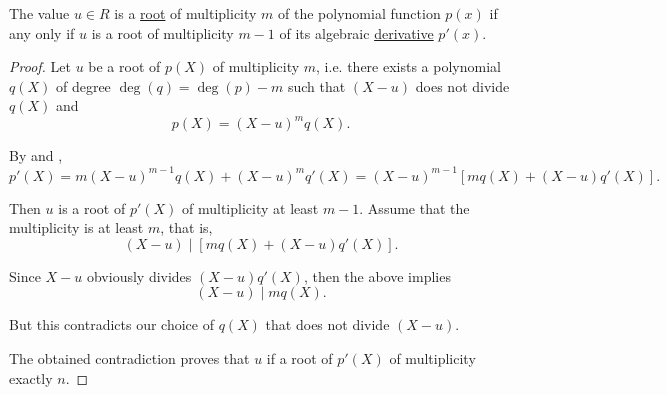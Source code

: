 \begin{corollary}\label{thm:repeated_root_iff_derivatives_divisible}
  The value \( u \in R \) is a \hyperref[def:semiring_kernel]{root} of multiplicity \( m \) of the polynomial function \( p(x) \) if any only if \( u \) is a root of multiplicity \( m - 1 \) of its algebraic \hyperref[def:algebraic_derivative]{derivative} \( p'(x) \).
\end{corollary}
\begin{proof}
  \SufficiencySubProof Let \( u \) be a root of \( p(X) \) of multiplicity \( m \), i.e. there exists a polynomial \( q(X) \) of degree \( \deg(q) = \deg(p) - m \) such that \( (X - u) \) does not divide \( q(X) \) and
  \begin{equation*}
    p(X) = (X - u)^m q(X).
  \end{equation*}

  By  and ,
  \begin{equation*}
    p'(X)
    =
    m (X - u)^{m-1} q(X) + (X - u)^m q'(X)
    =
    (X - u)^{m-1} [m q(X) + (X - u) q'(X)].
  \end{equation*}

  Then \( u \) is a root of \( p'(X) \) of multiplicity at least \( m - 1 \). Assume that the multiplicity is at least \( m \), that is,
  \begin{equation*}
    (X - u) \mid [mq(X) + (X - u) q'(X)].
  \end{equation*}

  Since \( X - u \) obviously divides \( (X - u) q'(X) \), then the above implies
  \begin{equation*}
    (X - u) \mid mq(X).
  \end{equation*}

  But this contradicts our choice of \( q(X) \) that does not divide \( (X - u) \).

  The obtained contradiction proves that \( u \) if a root of \( p'(X) \) of multiplicity exactly \( n \).
\end{proof}

